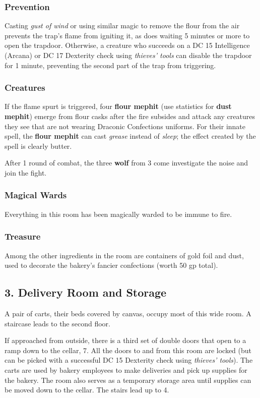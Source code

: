 \documentclass[10pt,a4paper,twoside,bg=print,twocolumn,openany,nodeprecatedcode]{dndbook}
\begin{document}
\subsubsection{Prevention}
Casting \textit{gust of wind} or using similar magic to remove the flour from the air prevents the trap's flame from igniting it, as does waiting 5 minutes or more to open the trapdoor. Otherwise, a creature who succeeds on a DC 15 Intelligence (Arcana) or DC 17 Dexterity check using \textit{thieves' tools} can disable the trapdoor for 1 minute, preventing the second part of the trap from triggering.

\subsubsection{Creatures}
If the flame spurt is triggered, four \textbf{flour mephit} (use statistics for \textbf{dust mephit}) emerge from flour casks after the fire subsides and attack any creatures they see that are not wearing Draconic Confections uniforms. For their innate spell, the \textbf{flour mephit} can cast \textit{grease} instead of \textit{sleep}; the effect created by the spell is clearly butter.

After 1 round of combat, the three \textbf{wolf} from 3 come investigate the noise and join the fight.

\subsubsection{Magical Wards}
Everything in this room has been magically warded to be immune to fire.

\subsubsection{Treasure}
Among the other ingredients in the room are containers of gold foil and dust, used to decorate the bakery's fancier confections (worth 50 gp total).

\subsection{3. Delivery Room and Storage}
\begin{DndReadAloud}{}
A pair of carts, their beds covered by canvas, occupy most of this wide room. A staircase leads to the second floor.

\end{DndReadAloud}

If approached from outside, there is a third set of double doors that open to a ramp down to the cellar, 7. All the doors to and from this room are locked (but can be picked with a successful DC 15 Dexterity check using \textit{thieves' tools}). The carts are used by bakery employees to make deliveries and pick up supplies for the bakery. The room also serves as a temporary storage area until supplies can be moved down to the cellar. The stairs lead up to 4.
\end{document}
